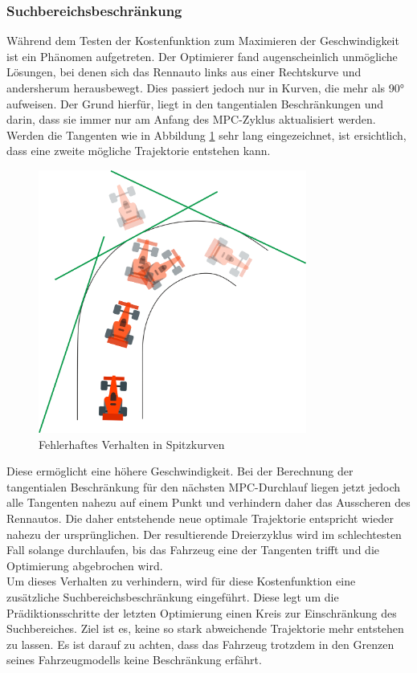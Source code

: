 \documentclass{like}
\begin{document}
\subsubsection*{Suchbereichsbeschränkung}
Während dem Testen der Kostenfunktion zum Maximieren der Geschwindigkeit ist ein Phänomen aufgetreten. Der Optimierer fand augenscheinlich unmögliche Lösungen, bei denen sich das Rennauto links aus einer Rechtskurve und andersherum herausbewegt.
Dies passiert jedoch nur in Kurven, die mehr als 90° aufweisen. Der Grund hierfür, liegt in den tangentialen Beschränkungen und darin, dass sie immer nur am Anfang des \ac{MPC}-Zyklus aktualisiert werden. Werden die Tangenten wie in Abbildung \ref{fig:curveAnomaly} sehr lang eingezeichnet, ist ersichtlich, dass eine zweite mögliche Trajektorie entstehen kann. 
\begin{figure}[ht!]
	\centering
	\includegraphics[width=250pt]{Abbildungen/curveAnomaly.png}
	\caption{Fehlerhaftes Verhalten in Spitzkurven}
	\label{fig:curveAnomaly}
\end{figure}
Diese ermöglicht eine höhere Geschwindigkeit. Bei der Berechnung der tangentialen Beschränkung für den nächsten \ac{MPC}-Durchlauf liegen jetzt jedoch alle Tangenten nahezu auf einem Punkt und verhindern daher das Ausscheren des Rennautos. Die daher entstehende neue optimale Trajektorie entspricht wieder nahezu der ursprünglichen. Der resultierende Dreierzyklus wird im schlechtesten Fall solange durchlaufen, bis das Fahrzeug eine der Tangenten trifft und die Optimierung abgebrochen wird.\\
Um dieses Verhalten zu verhindern, wird für diese Kostenfunktion eine zusätzliche Suchbereichsbeschränkung eingeführt. Diese legt um die Prädiktionsschritte der letzten Optimierung einen Kreis zur Einschränkung des Suchbereiches. Ziel ist es, keine so stark abweichende Trajektorie mehr entstehen zu lassen. Es ist darauf zu achten, dass das Fahrzeug trotzdem in den Grenzen seines Fahrzeugmodells keine Beschränkung erfährt. 
\end{document}
